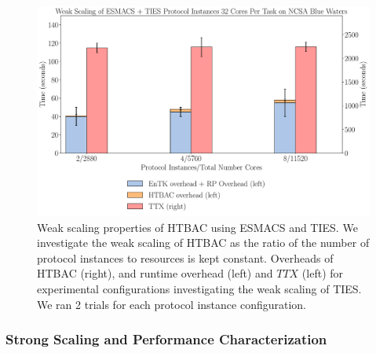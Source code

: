\begin{figure}
  \centering
    \includegraphics[width=\columnwidth]{figures/new_ws_esmacs_ties.pdf}
    \caption{Weak scaling properties of HTBAC using ESMACS and TIES. We
    investigate the weak scaling of HTBAC as the ratio of the number of
    protocol instances to resources is kept constant. Overheads of HTBAC
    (right), and runtime overhead (left) and \(TTX\) (left) for experimental
    configurations investigating the weak scaling of TIES. We ran 2 trials
    for each protocol instance configuration.}
\label{fig:weak_scaling_ESMACS_TIES}
\end{figure}



\subsubsection{Strong Scaling and Performance Characterization}


